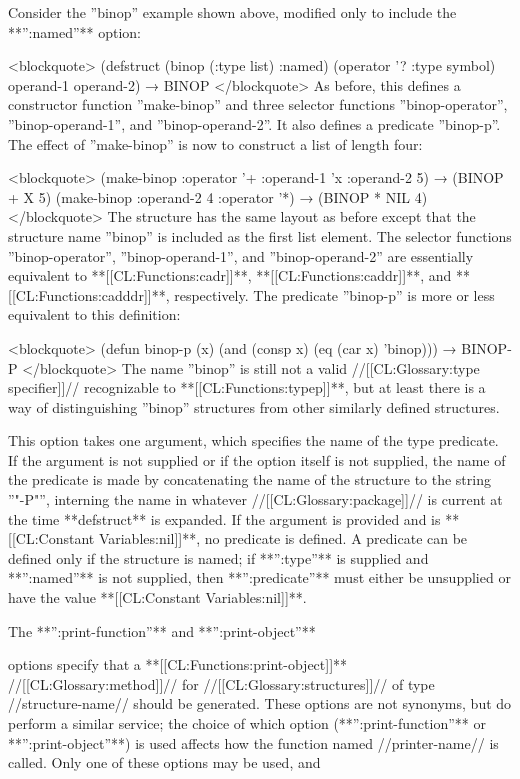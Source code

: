Consider the ''binop'' example shown above, modified only to include the **'':named''** option:

<blockquote> (defstruct (binop (:type list) :named) (operator '? :type symbol) operand-1 operand-2) → BINOP </blockquote> As before, this defines a constructor function ''make-binop'' and three selector functions ''binop-operator'', ''binop-operand-1'', and ''binop-operand-2''. It also defines a predicate ''binop-p''. The effect of ''make-binop'' is now to construct a list of length four:

<blockquote> (make-binop :operator '+ :operand-1 'x :operand-2 5) → (BINOP + X 5) (make-binop :operand-2 4 :operator '*) → (BINOP * NIL 4) </blockquote> The structure has the same layout as before except that the structure name ''binop'' is included as the first list element. The selector functions ''binop-operator'', ''binop-operand-1'', and ''binop-operand-2'' are essentially equivalent to **[[CL:Functions:cadr]]**, **[[CL:Functions:caddr]]**, and **[[CL:Functions:cadddr]]**, respectively. The predicate ''binop-p'' is more or less equivalent to this definition:

<blockquote> (defun binop-p (x) (and (consp x) (eq (car x) 'binop))) → BINOP-P </blockquote> The name ''binop'' is still not a valid //[[CL:Glossary:type specifier]]// recognizable to **[[CL:Functions:typep]]**, but at least there is a way of distinguishing ''binop'' structures from other similarly defined structures.


This option takes one argument, which specifies the name of the type predicate. If the argument is not supplied or if the option itself is not supplied, the name of the predicate is made by concatenating the name of the structure to the string ''"-P"'', interning the name in whatever //[[CL:Glossary:package]]// is current at the time **defstruct** is expanded. If the argument is provided and is **[[CL:Constant Variables:nil]]**, no predicate is defined. A predicate can be defined only if the structure is named; if **'':type''** is supplied and **'':named''** is not supplied, then **'':predicate''** must either be unsupplied or have the value **[[CL:Constant Variables:nil]]**.


The **'':print-function''** and **'':print-object''**

options specify that a **[[CL:Functions:print-object]]** //[[CL:Glossary:method]]// for //[[CL:Glossary:structures]]// of type //structure-name// should be generated. These options are not synonyms, but do perform a similar service; the choice of which option (**'':print-function''** or **'':print-object''**) is used affects how the function named //printer-name// is called. Only one of these options may be used, and

